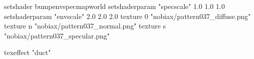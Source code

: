 setshader bumpenvspecmapworld
setshaderparam "specscale" 1.0 1.0 1.0
setshaderparam "envscale"  2.0 2.0 2.0
   texture 0 "nobiax/pattern037_diffuse.png"
   texture n "nobiax/pattern037_normal.png"
   texture s "nobiax/pattern037_specular.png"

texeffect "duct"
